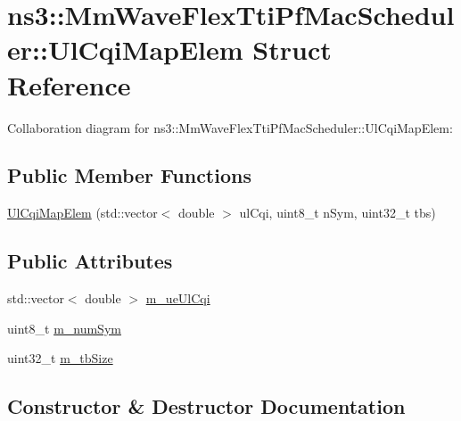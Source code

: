 \hypertarget{structns3_1_1MmWaveFlexTtiPfMacScheduler_1_1UlCqiMapElem}{}\section{ns3\+:\+:Mm\+Wave\+Flex\+Tti\+Pf\+Mac\+Scheduler\+:\+:Ul\+Cqi\+Map\+Elem Struct Reference}
\label{structns3_1_1MmWaveFlexTtiPfMacScheduler_1_1UlCqiMapElem}


Collaboration diagram for ns3\+:\+:Mm\+Wave\+Flex\+Tti\+Pf\+Mac\+Scheduler\+:\+:Ul\+Cqi\+Map\+Elem\+:
\subsection*{Public Member Functions}
\begin{DoxyCompactItemize}
\item 
\hyperlink{structns3_1_1MmWaveFlexTtiPfMacScheduler_1_1UlCqiMapElem_a4331d6e5992461ed6368dd274746194b}{Ul\+Cqi\+Map\+Elem} (std\+::vector$<$ double $>$ ul\+Cqi, uint8\+\_\+t n\+Sym, uint32\+\_\+t tbs)
\end{DoxyCompactItemize}
\subsection*{Public Attributes}
\begin{DoxyCompactItemize}
\item 
std\+::vector$<$ double $>$ \hyperlink{structns3_1_1MmWaveFlexTtiPfMacScheduler_1_1UlCqiMapElem_a9fc2297f7aca6aff6ced11aa00d15ca6}{m\+\_\+ue\+Ul\+Cqi}
\item 
uint8\+\_\+t \hyperlink{structns3_1_1MmWaveFlexTtiPfMacScheduler_1_1UlCqiMapElem_a8a6bebcbc42b98a403ea447908e97249}{m\+\_\+num\+Sym}
\item 
uint32\+\_\+t \hyperlink{structns3_1_1MmWaveFlexTtiPfMacScheduler_1_1UlCqiMapElem_a93f9bfc2fe75d6fecbbe0787dd6031ac}{m\+\_\+tb\+Size}
\end{DoxyCompactItemize}


\subsection{Constructor \& Destructor Documentation}
